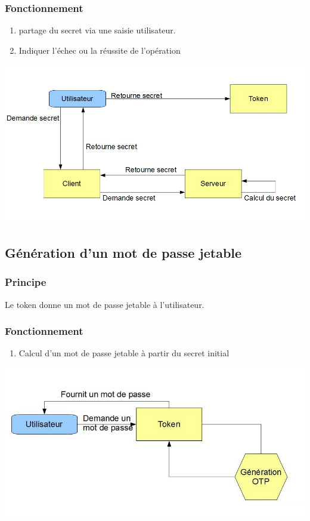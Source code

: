 \documentclass{"../../res/univ-projet"}
\begin{document}
\subsubsection{Fonctionnement}
\begin{enumerate}
    \item partage du secret via une saisie utilisateur.
    \item Indiquer l'échec ou la réussite de l'opération
\end{enumerate}
\includegraphics[width=\textwidth]{../graphics/association.jpg}

\subsection{Génération d'un mot de passe jetable}
\subsubsection{Principe}
Le token donne un mot de passe jetable à l'utilisateur.

\subsubsection{Fonctionnement}
\begin{enumerate}
    \item Calcul d'un mot de passe jetable à partir du secret 
        initial
\end{enumerate}
\includegraphics[width=\textwidth]{../graphics/generation.jpg}
\end{document}
